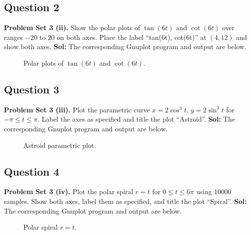 \documentclass{book}
\begin{document}
\newpage
\subsection*{Question 2}
\noindent\textbf{Problem Set 3 (ii).} Show the polar plots of $\tan(6t)$ and $\cot(6t)$ over ranges $-20$ to $20$ on both axes. Place the label ``tan(6t), cot(6t)'' at $(4,12)$ and show both axes.
\noindent\textbf{Sol:} The corresponding Gnuplot program and output are below.

\begin{figure}[htbp]
    \centering
    
    \caption{Polar plots of $\tan(6t)$ and $\cot(6t)$.}
\end{figure}

\newpage
\subsection*{Question 3}
\noindent\textbf{Problem Set 3 (iii).} Plot the parametric curve $x=2\cos^3t$, $y=2\sin^3t$ for $-\pi\leq t\leq\pi$. Label the axes as specified and title the plot ``Astroid''.
\noindent\textbf{Sol:} The corresponding Gnuplot program and output are below.

\begin{figure}[htbp]
    \centering
    
    \caption{Astroid parametric plot.}
\end{figure}

\newpage
\subsection*{Question 4}
\noindent\textbf{Problem Set 3 (iv).} Plot the polar spiral $r=t$ for $0\leq t\leq6\pi$ using $10000$ samples. Show both axes, label them as specified, and title the plot ``Spiral''.
\noindent\textbf{Sol:} The corresponding Gnuplot program and output are below.

\begin{figure}[htbp]
    \centering
    
    \caption{Polar spiral $r=t$.}
\end{figure}

\newpage
\end{document}
